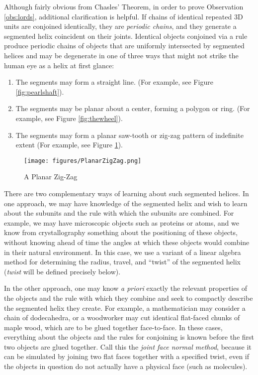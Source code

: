 \documentclass[11pt]{article}
\begin{document}
{Although fairly obvious from Chasles' Theorem, in order to prove Observation \ref{obs:lords},
additional clarification is helpful.
If chains of identical repeated 3D units are conjoined identically, they are {\em periodic chains},
and they generate a segmented helix coincident on their joints.
Identical objects conjoined via a rule
produce periodic chains of objects that are uniformly intersected
by segmented helices and may be degenerate in one of
three ways that might not strike the human eye as a helix at first glance:
\begin{enumerate}
\item The segments may form a straight line. (For example, see Figure \ref{fig:pearlshaft}).
\item The segments may be planar about a center, forming a polygon or ring. (For example, see Figure \ref{fig:thewheel}).
\item The segments may form a planar saw-tooth or zig-zag pattern of indefinite extent (For example, see Figure \ref{fig:planarzigzag}).
\end{enumerate}

\begin{figure}
     \centering
     \texttt{[image: figures/PlanarZigZag.png]}
     \caption{A Planar Zig-Zag}
  \label{fig:planarzigzag}
\end{figure}

There are two complementary ways of learning about such segmented helices.
In one approach, we may have knowledge of the segmented helix and
wish to learn about the subunits and the rule with which the subunits are combined.
For example, we may have microscopic objects such as proteins
or atoms, and we know from crystallography something about the positioning of these objects, without
knowing ahead of time the angles at which these objects would combine in their natural environment.
In this case, we use a variant of a linear algebra method\cite{kahn1989defining}
for determining the radius, travel, and ``twist''
of the segmented helix ({\em twist} will be defined precisely below).

In the other approach, one may know {\it a priori} exactly the
relevant properties of the objects and the rule with which they combine
and seek to compactly describe the segmented helix they create.
For example, a mathematician may consider a chain of dodecahedra,
or a woodworker may cut identical flat-faced chunks of maple wood,
which are to be glued together face-to-face.
In these cases, everything about the objects and the rules for conjoining
is known before the first two objects are glued together.
Call this the {\em joint face normal method}, because
it can be simulated by joining two flat faces together with a specified twist,
even if the objects in question
do not actually have a physical face (such as molecules).

}
\end{document}
